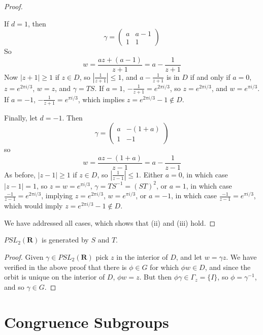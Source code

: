 \begin{proof}
\begin{itemize}
        If $d = 1$, then
        \[ \gamma = \begin{pmatrix} a & a-1 \\ 1 & 1 \end{pmatrix} \]
        So
        \[ w = \frac{az + (a-1)}{z + 1} = a - \frac{1}{z+1} \]
        Now $|z+1| \geq 1$ if $z \in D$, so $|\frac{1}{z+1}| \leq 1$, and $a - \frac{1}{z+1}$ is in $D$ if and only if $a = 0$, $z = e^{2\pi i/3}$, $w = z$, and $\gamma = TS$. If $a = 1$, $- \frac{1}{z+1} = e^{2\pi i/3}$, so $z = e^{2 \pi i/3}$, and $w = e^{\pi i/3}$. If $a = -1$, $- \frac{1}{z+1} = e^{\pi i/3}$, which implies $z = e^{2 \pi i/3} - 1 \not \in D$.

        Finally, let $d = -1$. Then
        \[ \gamma = \begin{pmatrix} a & -(1 + a) \\ 1 & -1 \end{pmatrix} \]
        so
        \[ w = \frac{az - (1+a)}{z-1} = a - \frac{1}{z-1} \]
        As before, $|z-1| \geq 1$ if $z \in D$, so $|\frac{1}{z-1}| \leq 1$. Either $a = 0$, in which case $|z-1| = 1$, so $z = w = e^{\pi i/3}$, $\gamma = TS^{-1} = (ST)^2$, or $a = 1$, in which case $\frac{-1}{z-1} = e^{2\pi i/3}$, implying $z = e^{2\pi i/3}$, $w = e^{\pi i/3}$, or $a = -1$, in which case $\frac{-1}{z-1} = e^{\pi i/3}$, which would imply $z = e^{2\pi i/3} - 1 \not \in D$.
    \end{itemize}
    We have addressed all cases, which shows that (ii) and (iii) hold.
\end{proof}

\begin{corollary}
    $PSL_2(\mathbf{R})$ is generated by $S$ and $T$.
\end{corollary}
\begin{proof}
    Given $\gamma \in PSL_2(\mathbf{R})$ pick $z$ in the interior of $D$, and let $w = \gamma z$. We have verified in the above proof that there is $\phi \in G$ for which $\phi w \in D$, and since the orbit is unique on the interior of $D$, $\phi w = z$. But then $\phi \gamma \in \Gamma_z = \{ I \}$, so $\phi = \gamma^{-1}$, and so $\gamma \in G$.
\end{proof}

\section{Congruence Subgroups}

